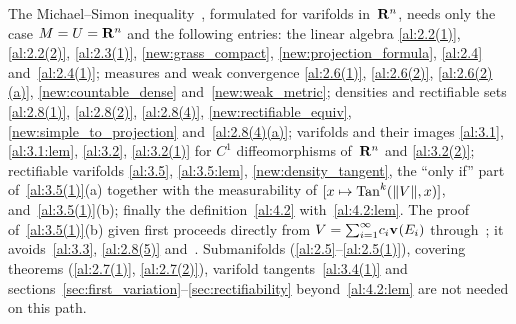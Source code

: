 \documentclass[a4paper,twoside,leqno]{article}
\begin{document}

\begin{remark}
    \label{rem:ms_path}
    The Michael--Simon inequality~\cite[Theorem~2.1]{Michael1973}, formulated for varifolds
    in~$\mathbf{R}^{n}$, needs only the case $M = U = \mathbf{R}^{n}$ and the following entries: the linear algebra \ref{al:2.2(1)}, \ref{al:2.2(2)}, \ref{al:2.3(1)},
    \ref{new:grass_compact}, \ref{new:projection_formula}, \ref{al:2.4} and~\ref{al:2.4(1)};
    measures and weak convergence \ref{al:2.6(1)}, \ref{al:2.6(2)}, \ref{al:2.6(2)(a)},
    \ref{new:countable_dense} and~\ref{new:weak_metric}; densities and rectifiable sets
    \ref{al:2.8(1)}, \ref{al:2.8(2)}, \ref{al:2.8(4)}, \ref{new:rectifiable_equiv},
    \ref{new:simple_to_projection} and~\ref{al:2.8(4)(a)}; varifolds and their images
    \ref{al:3.1}, \ref{al:3.1:lem}, \ref{al:3.2}, \ref{al:3.2(1)} for $C^1$ diffeomorphisms
    of~$\mathbf{R}^{n}$ and \ref{al:3.2(2)}; rectifiable varifolds \ref{al:3.5}, \ref{al:3.5:lem},
    \ref{new:density_tangent}, the ``only if'' part of~\ref{al:3.5(1)}(a) together with the
    measurability of $[x \mapsto \operatorname{Tan}^{k}(\|V\|,x)]$, and~\ref{al:3.5(1)}(b); finally the
    definition~\ref{al:4.2} with~\ref{al:4.2:lem}. The proof of~\ref{al:3.5(1)}(b) given first
    proceeds directly from $V = {\textstyle\sum_{i=1}^{\infty}} c_i \mathbf{v}_{}(E_i)$
    through~\cite[2.8.18, 2.9.9, 2.10.19(4), 3.2.19, 3.2.25]{Federer1969}; it avoids~\ref{al:3.3},
    \ref{al:2.8(5)} and~\cite[3.3.17]{Federer1969}. Submanifolds (\ref{al:2.5}--\ref{al:2.5(1)}),
    covering theorems (\ref{al:2.7(1)}, \ref{al:2.7(2)}), varifold tangents~\ref{al:3.4(1)} and
    sections~\ref{sec:first_variation}--\ref{sec:rectifiability} beyond~\ref{al:4.2:lem} are not
    needed on this path.
\end{remark}
\end{document}
